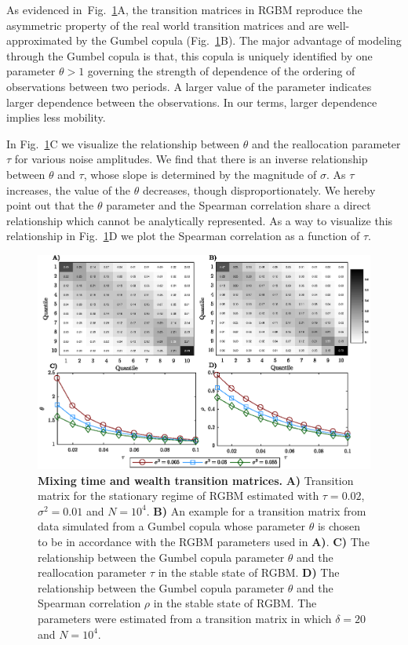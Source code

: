 \documentclass[11pt]{article}
\newcommand{\fref}[1]{Fig.~\ref{fig:#1}}
\numberwithin{equation}{section}
\begin{document}
As evidenced in~\fref{rgbm-wealth-matrices}A, the transition matrices in RGBM reproduce the asymmetric property of the real world transition matrices and are well-approximated by the Gumbel copula (\fref{rgbm-wealth-matrices}B). The major advantage of modeling through the Gumbel copula is that, this copula is uniquely identified by one parameter $\theta>1$ governing the strength of dependence of the ordering of observations between two periods. A larger value of the parameter indicates larger dependence between the observations. In our terms, larger dependence implies less mobility.

In \fref{rgbm-wealth-matrices}C we visualize the relationship between $\theta$ and the reallocation parameter $\tau$ for various noise amplitudes. We find that there is an inverse relationship between $\theta$ and $\tau$, whose slope is determined by the magnitude of $\sigma$. As $\tau$ increases, the value of the $\theta$ decreases, though disproportionately. We hereby point out that the $\theta$ parameter and the Spearman correlation share a direct relationship which cannot be analytically represented. As a way to visualize this relationship in \fref{rgbm-wealth-matrices}D we plot the Spearman correlation as a function of $\tau$.

\begin{figure}[!htb]
\centering
\includegraphics[width=1.0\textwidth]{figs/fig_rgbm_gumbel_v2.eps}
\caption{\textbf{Mixing time and wealth transition matrices.} \textbf{A)} Transition matrix for the stationary regime of RGBM estimated with $\tau = 0.02$, $\sigma^2 = 0.01$ and $N = 10^4$. \textbf{B)} An example for a transition matrix from data simulated from a Gumbel copula whose parameter $\theta$ is chosen to be in accordance with the RGBM parameters used in \textbf{A)}. \textbf{C)} The relationship between the Gumbel copula parameter $\theta$ and the reallocation parameter $\tau$ in the stable state of RGBM. \textbf{D)} The relationship between the Gumbel copula parameter $\theta$ and the Spearman correlation $\rho$ in the stable state of RGBM. The parameters were estimated from a transition matrix in which $\delta = 20$ and $N = 10^4$.
\label{fig:rgbm-wealth-matrices}}
\end{figure}
\FloatBarrier
\end{document}
